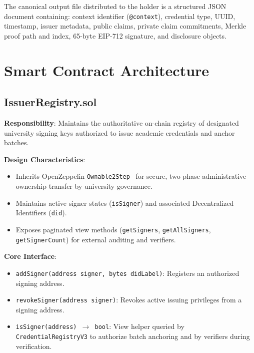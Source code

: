 The canonical output file distributed to the holder is a structured JSON document containing: context identifier (\texttt{@context}), credential type, UUID, timestamp, issuer metadata, public claims, private claim commitments, Merkle proof path and index, 65-byte EIP-712 signature, and disclosure objects.

\section{Smart Contract Architecture}

\subsection{IssuerRegistry.sol}

\textbf{Responsibility}: Maintains the authoritative on-chain registry of designated university signing keys authorized to issue academic credentials and anchor batches.

\textbf{Design Characteristics}:
\begin{itemize}
    \item Inherits OpenZeppelin \texttt{Ownable2Step}~\cite{OZContracts} for secure, two-phase administrative ownership transfer by university governance.
    \item Maintains active signer states (\texttt{isSigner}) and associated Decentralized Identifiers (\texttt{did}).
    \item Exposes paginated view methods (\texttt{getSigners}, \texttt{getAllSigners}, \texttt{getSignerCount}) for external auditing and verifiers.
\end{itemize}

\textbf{Core Interface}:
\begin{itemize}
    \item \texttt{addSigner(address signer, bytes didLabel)}: Registers an authorized signing address.
    \item \texttt{revokeSigner(address signer)}: Revokes active issuing privileges from a signing address.
    \item \texttt{isSigner(address) $\rightarrow$ bool}: View helper queried by \texttt{CredentialRegistryV3} to authorize batch anchoring and by verifiers during verification.
\end{itemize}

